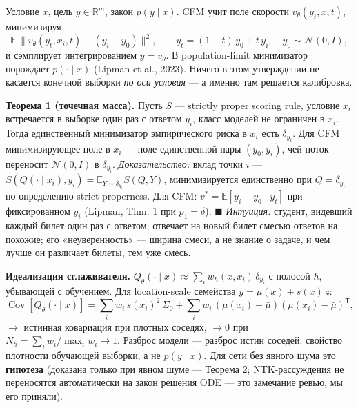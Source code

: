 \documentclass[11pt]{article}
\begin{document}
Условие $x$, цель $y \in \mathbb{R}^m$, закон $p(y\mid x)$. CFM учит поле скорости $v_\theta(y_t, x, t)$, минимизируя \[\mathbb{E}\,\big\|v_\theta(y_t, x_i, t) - (y_i - y_0)\big\|^2,\qquad y_t = (1-t)\,y_0 + t\,y_i,\quad y_0 \sim \mathcal N(0, I),\] и сэмплирует интегрированием $\dot y = v_\theta$. В population-limit минимизатор порождает $p(\cdot\mid x)$ (Lipman et al., 2023). Ничего в этом утверждении не касается конечной выборки \emph{по оси условия} — а именно там решается калибровка.

\textbf{Теорема 1 (точечная масса).} Пусть $S$ — strictly proper scoring rule, условие $x_i$ встречается в выборке один раз с ответом $y_i$, класс моделей не ограничен в $x_i$. Тогда единственный минимизатор эмпирического риска в $x_i$ есть $\delta_{y_i}$. Для CFM минимизирующее поле в $x_i$ — поле единственной пары $(y_0, y_i)$, чей поток переносит $\mathcal N(0, I)$ в $\delta_{y_i}$. \emph{Доказательство:} вклад точки $i$ — $S(Q(\cdot\mid x_i), y_i) = \mathbb{E}_{Y\sim\delta_{y_i}} S(Q, Y)$, минимизируется единственно при $Q = \delta_{y_i}$ по определению strict properness. Для CFM: $v^* = \mathbb{E}[y_i - y_0 \mid y_t]$ при фиксированном $y_i$ (Lipman, Thm. 1 при $p_1 = \delta$). $\blacksquare$ \emph{Интуиция:} студент, видевший каждый билет один раз с ответом, отвечает на новый билет смесью ответов на похожие; его «неуверенность» — ширина смеси, а не знание о задаче, и чем лучше он различает билеты, тем уже смесь.

\textbf{Идеализация сглаживателя.} $Q_\theta(\cdot\mid x) \approx \sum_i w_h(x, x_i)\,\delta_{y_i}$ с полосой $h$, убывающей с обучением. Для location-scale семейства $y = \mu(x) + s(x)\,z$: \[\operatorname{Cov}[Q_\theta(\cdot\mid x)] = \sum_i w_i\, s(x_i)^2\, \Sigma_0 + \sum_i w_i\,(\mu(x_i) - \bar\mu)(\mu(x_i) - \bar\mu)^{\mathsf T},\] $\to$ истинная ковариация при плотных соседях, $\to 0$ при $N_h = \sum_i w_i / \max_i w_i \to 1$. Разброс модели — разброс истин соседей, свойство плотности обучающей выборки, а не $p(y\mid x)$. Для сети без явного шума это \textbf{гипотеза} (доказана только при явном шуме — Теорема 2; NTK-рассуждения не переносятся автоматически на закон решения ODE — это замечание ревью, мы его приняли).
\end{document}
